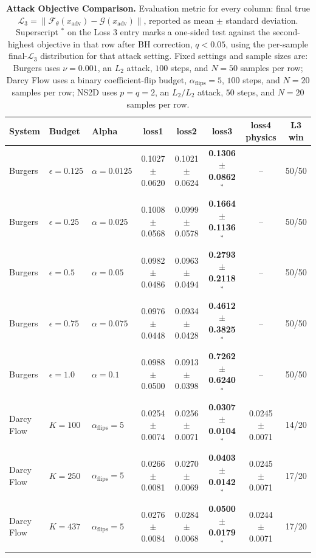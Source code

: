 \documentclass[letterpaper]{article} %
\begin{document}
\begin{table}[t]
\centering
\footnotesize
\setlength{\tabcolsep}{2pt}
\caption{\textbf{Attack Objective Comparison.} Evaluation metric for every
column: final true $\mathcal{L}_3=\|\mathcal{F}_\theta(x_{\mathrm{adv}})
-\mathcal{G}(x_{\mathrm{adv}})\|$, reported as mean $\pm$ standard deviation.
Superscript \(^{*}\) on the Loss 3 entry marks a one-sided test against the
second-highest objective in that row after BH correction, \(q<0.05\), using
the per-sample final-\(\mathcal L_3\) distribution for that attack setting.
Fixed settings and sample sizes are: Burgers uses $\nu=0.001$, an $L_2$
attack, $100$ steps, and $N=50$ samples per row; Darcy Flow uses a binary
coefficient-flip budget, $\alpha_{\mathrm{flips}}=5$, $100$ steps, and
$N=20$ samples per row; NS2D uses $p=q=2$, an $L_2/L_2$ attack, $50$ steps,
and $N=20$ samples per row.}
\label{tab:attack_objective_true_l3_summary}
\begin{tabular}{@{}lllccccc@{}}
\toprule
System & Budget & Alpha & loss1 & loss2 & \textbf{loss3} & loss4 physics & L3 win \\
\midrule
Burgers & $\epsilon=0.125$ & $\alpha=0.0125$
& 0.1027 \(\pm\) 0.0620 & 0.1021 \(\pm\) 0.0624 & \textbf{0.1306 \(\pm\) 0.0862}\(^{*}\) & -- & 50/50 \\
Burgers & $\epsilon=0.25$ & $\alpha=0.025$
& 0.1008 \(\pm\) 0.0568 & 0.0999 \(\pm\) 0.0578 & \textbf{0.1664 \(\pm\) 0.1136}\(^{*}\) & -- & 50/50 \\
Burgers & $\epsilon=0.5$ & $\alpha=0.05$
& 0.0982 \(\pm\) 0.0486 & 0.0963 \(\pm\) 0.0494 & \textbf{0.2793 \(\pm\) 0.2118}\(^{*}\) & -- & 50/50 \\
Burgers & $\epsilon=0.75$ & $\alpha=0.075$
& 0.0976 \(\pm\) 0.0448 & 0.0934 \(\pm\) 0.0428 & \textbf{0.4612 \(\pm\) 0.3825}\(^{*}\) & -- & 50/50 \\
Burgers & $\epsilon=1.0$ & $\alpha=0.1$
& 0.0988 \(\pm\) 0.0500 & 0.0913 \(\pm\) 0.0398 & \textbf{0.7262 \(\pm\) 0.6240}\(^{*}\) & -- & 50/50 \\
\midrule
Darcy Flow & $K=100$ & $\alpha_{\mathrm{flips}}=5$
& 0.0254 \(\pm\) 0.0074 & 0.0256 \(\pm\) 0.0071 & \textbf{0.0307 \(\pm\) 0.0104}\(^{*}\) & 0.0245 \(\pm\) 0.0071 & 14/20 \\
Darcy Flow & $K=250$ & $\alpha_{\mathrm{flips}}=5$
& 0.0266 \(\pm\) 0.0081 & 0.0270 \(\pm\) 0.0069 & \textbf{0.0403 \(\pm\) 0.0142}\(^{*}\) & 0.0245 \(\pm\) 0.0071 & 17/20 \\
Darcy Flow & $K=437$ & $\alpha_{\mathrm{flips}}=5$
& 0.0276 \(\pm\) 0.0084 & 0.0284 \(\pm\) 0.0068 & \textbf{0.0500 \(\pm\) 0.0179}\(^{*}\) & 0.0244 \(\pm\) 0.0071 & 17/20 \\

\end{tabular}
\end{table}
\end{document}

